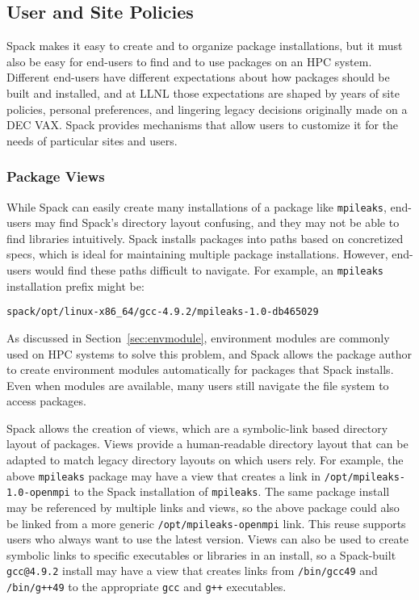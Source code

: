 
\subsection{User and Site Policies}
\label{sec:usecase-policy}

Spack makes it easy to create and to organize package installations,
but it must also be easy for end-users to find and to use packages on an HPC
system. Different end-users have different expectations about how packages
should be built and installed, and at LLNL those expectations are shaped
by years of site policies, personal preferences, and lingering legacy
decisions originally made on a DEC VAX.
Spack provides mechanisms that allow users to customize it for the needs
of particular sites and users.


\subsubsection{Package Views}
\label{sec:package-views}

While Spack can easily create many installations of a package like 
{\tt mpileaks}, end-users may find Spack's 
directory layout confusing, and they may not be able to find libraries 
intuitively. Spack installs packages into paths based on concretized specs,
which is ideal for maintaining multiple package installations. However, 
end-users would find these paths difficult to navigate. 
For example, an {\tt mpileaks} installation prefix might be:
%
\begin{verbatim}
spack/opt/linux-x86_64/gcc-4.9.2/mpileaks-1.0-db465029
\end{verbatim}

As discussed in Section~\ref{sec:envmodule},
environment modules are commonly used on HPC systems to solve this problem,
and Spack allows the package author to create environment modules 
automatically for packages that Spack installs.
Even when modules are available, many users still
navigate the file system to access packages.

Spack allows the creation of views, which are a symbolic-link based directory 
layout of packages. Views provide a human-readable directory layout that
can be adapted to match legacy directory layouts on which users rely. For 
example, the above {\tt mpileaks} package may have a view that creates a link 
in {\tt /opt/mpileaks-1.0-openmpi} to the Spack installation of {\tt mpileaks}.
The same package install may be referenced by multiple links and views,
so the above package could also be linked from a more generic {\tt /opt/mpileaks-openmpi}
link. This reuse supports users who always want to use the latest version.
Views can also be used to create symbolic links to specific executables or libraries in an install,
so a Spack-built {\tt gcc@4.9.2} install may have a view that creates links from
{\tt /bin/gcc49} and {\tt /bin/g++49} to the appropriate {\tt gcc} and {\tt g++} executables.

